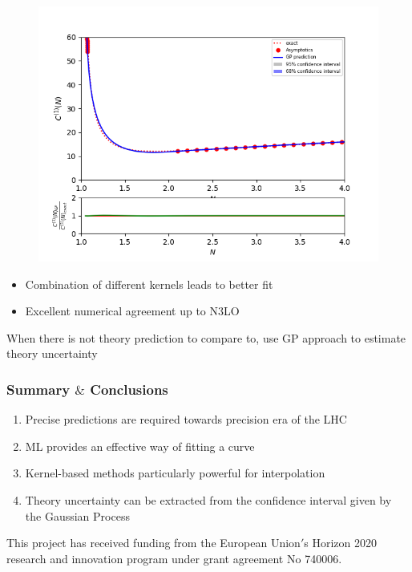 \documentclass[aspectratio=43]{beamer}
\begin{document}
\begin{frame}
\begin{figure}
		\includegraphics[width = \linewidth]{plots/nlo_matern1.png}
		\endminipage
	\end{figure}
	
	\begin{itemize}
		\item Combination of different kernels leads to better fit
		\item Excellent numerical agreement up to N3LO
	\end{itemize}
	
	{\color{blue}When there is not theory prediction to compare to, use GP approach to estimate theory uncertainty}

\end{frame}

\begin{frame}
	
	\frametitle{Summary $\&$ Conclusions}

	\vspace{2.0 cm}
	
	\begin{enumerate}
		\item Precise predictions are required towards precision era of the LHC
		\item ML provides an effective way of fitting a curve
		\item Kernel-based methods particularly powerful for interpolation
		\item Theory uncertainty can be extracted from the confidence interval given by the Gaussian Process
	\end{enumerate}

	\vspace{2.0 cm}

	{\small \color{blue} This project has received funding from the European Union$'$s Horizon 2020 research and innovation program under grant agreement No 740006.}

\end{frame}
\end{document}
